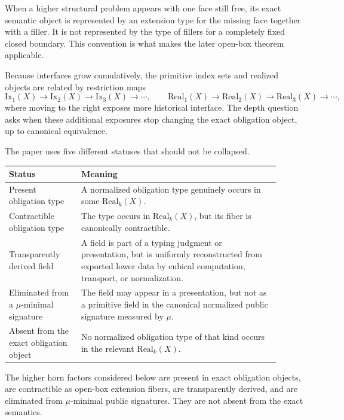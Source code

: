 When a higher structural problem appears with one face still free, its exact semantic object
is represented by an extension type for the missing face together with a filler.  It is not
represented by the type of fillers for a completely fixed closed boundary.  This convention is
what makes the later open-box theorem applicable.

Because interfaces grow cumulatively, the primitive index sets and realized objects are
related by restriction maps
\[
  \mathrm{Ix}_1(X) \to \mathrm{Ix}_2(X) \to \mathrm{Ix}_3(X) \to \cdots,
  \qquad
  \mathrm{Real}_1(X) \to \mathrm{Real}_2(X) \to \mathrm{Real}_3(X) \to \cdots,
\]
where moving to the right exposes more historical interface.  The depth question asks when
these additional exposures stop changing the exact obligation object, up to canonical
equivalence.

\begin{remark}
\label{rem:five-statuses}
The paper uses five different statuses that should not be collapsed.
\begin{center}
\small
\begin{tabular}{p{0.24\linewidth}p{0.66\linewidth}}
\hline
Status & Meaning \\
\hline
Present obligation type & A normalized obligation type genuinely occurs in some
\(\mathrm{Real}_k(X)\). \\
Contractible obligation type & The type occurs in \(\mathrm{Real}_k(X)\), but its fiber is
canonically contractible. \\
Transparently derived field & A field is part of a typing judgment or presentation, but is
uniformly reconstructed from exported lower data by cubical computation, transport, or
normalization. \\
Eliminated from a \(\mu\)-minimal signature & The field may appear in a presentation, but
not as a primitive field in the canonical normalized public signature measured by \(\mu\). \\
Absent from the exact obligation object & No normalized obligation type of that kind occurs
in the relevant \(\mathrm{Real}_k(X)\). \\
\hline
\end{tabular}
\end{center}
The higher horn factors considered below are present in exact obligation objects, are
contractible as open-box extension fibers, are transparently derived, and are eliminated from
\(\mu\)-minimal public signatures.  They are not absent from the exact semantics.
\end{remark}

